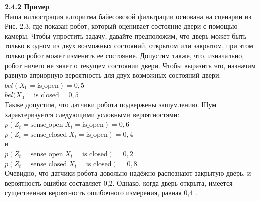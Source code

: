 \documentclass[10pt,a4paper]{article}
\begin{document}
 \textbf{2.4.2 Пример}\\
 
 Наша иллюстрация алгоритма байесовской фильтрации основана на сценарии из Рис. 2.3, где показан робот, который оценивает состояние двери с помощью камеры.  Чтобы упростить задачу, давайте предположим, что дверь может быть только в одном из двух возможных состояний, открытом или закрытом, при этом только робот может изменить ее состояние. Допустим также, что, изначально, робот ничего не знает о текущем состоянии двери. Чтобы выразить это, назначим равную априорную вероятность для двух возможных состояний двери:\\ 
 $bel(X_0=\mbox{is\_open}) = 0,5$\\
 $bel(X_0=\mbox{is\_closed} = 0,5$\\
 Также допустим, что датчики робота подвержены зашумлению. Шум характеризуется следующими условными вероятностями:\\
 $p(Z_t =\mbox{sense\_open} | X_t =\mbox{is\_open}) = 0,6$\\ 
 $p(Z_t = \mbox{sense\_closed} | X_t =\mbox{is\_open}) = 0,4$\\
 и\\
 $p(Z_t =\mbox{sense\_open} | X_t =\mbox{is\_closed}) = 0,2$\\
 $p(Z_t =\mbox{sense\_closed} | X_t =\mbox{is\_closed} ) = 0,8$\\
 Очевидно, что датчики робота довольно надёжно распознают закрытую дверь, и вероятность ошибки составляет 0,2. Однако, когда дверь открыта, имеется существенная вероятность ошибочного измерения, равная 0,4 .
 
\end{document}
